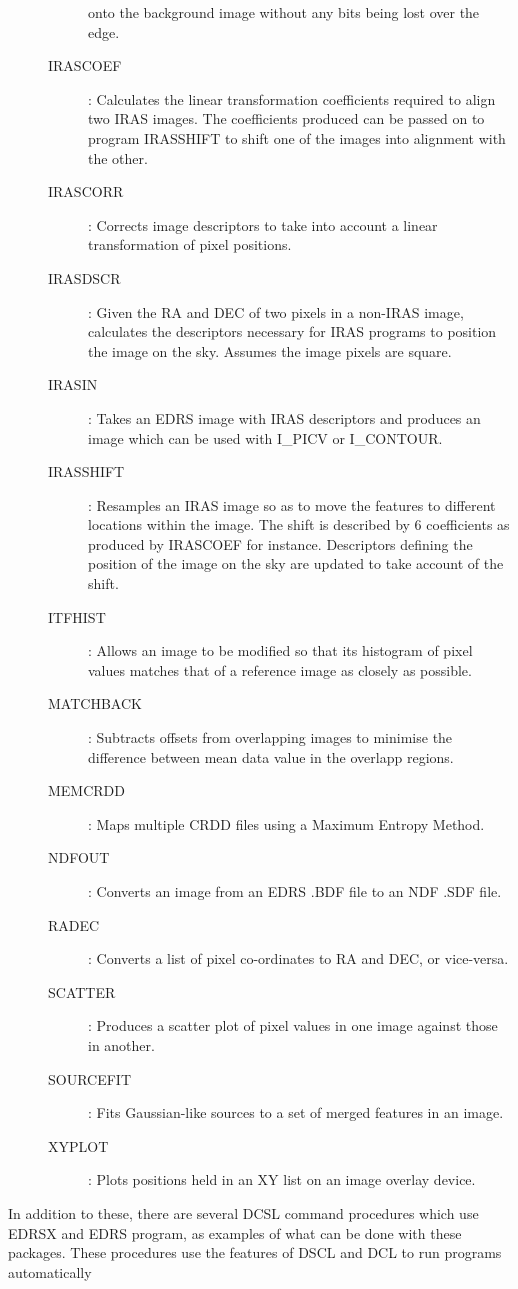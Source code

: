 \begin{description}
\begin{description}
onto the background image without any bits being lost over the edge.
\item[IRASCOEF]: Calculates the linear transformation coefficients required to
align two IRAS images.
The coefficients produced can be passed on to program IRASSHIFT to shift one of
the images into alignment with the other.
\item[IRASCORR]: Corrects image descriptors to take into account a linear
transformation of pixel positions.
\item[IRASDSCR]: Given the RA and DEC of two pixels in a non-IRAS image,
calculates the descriptors necessary for IRAS programs to position the image on
the sky.
Assumes the image pixels are square.
\item[IRASIN]: Takes an EDRS image with IRAS descriptors and produces an image
which can be used with I\_PICV or I\_CONTOUR.
\item[IRASSHIFT]: Resamples an IRAS image so as to move the features to
different locations within the image.
The shift is described by 6 coefficients as produced by IRASCOEF for instance.
Descriptors defining the position of the image on the sky are updated to take
account of the shift.
\item[ITFHIST]: Allows an image to be modified so that its histogram of pixel
values matches that of a reference image as closely as possible.
\item[MATCHBACK]: Subtracts offsets from overlapping images to minimise
the difference between mean data value in the overlapp regions.
\item[MEMCRDD]: Maps multiple CRDD files using a Maximum Entropy Method.
\item[NDFOUT]: Converts an image from an EDRS .BDF file to an NDF .SDF file.
\item[RADEC]: Converts a list of pixel co-ordinates to RA and DEC, or
vice-versa.
\item[SCATTER]: Produces a scatter plot of pixel values in one image
against those in another.
\item[SOURCEFIT]: Fits Gaussian-like sources to a set of merged features in an
image.
\item[XYPLOT]: Plots positions held in an XY list on an image overlay device.
\end{description}
\end{description}
In addition to these, there are several DCSL command procedures which use EDRSX
and EDRS program, as examples of what can be done with these packages.
These procedures use the features of DSCL and DCL to run programs automatically
